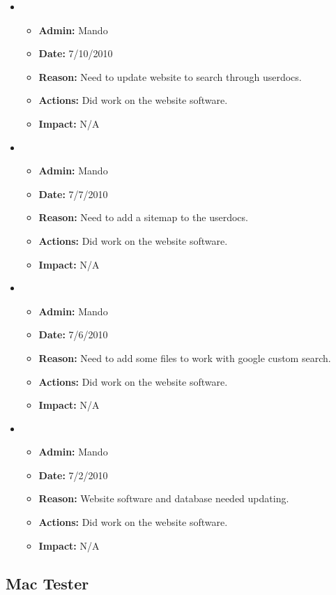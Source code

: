 \documentclass[12pt]{article}
\begin{document}
\begin{itemize}
\item 
\begin{itemize}
\item[] {\bf Admin:} Mando
\item[] {\bf Date:} 7/10/2010
\item[] {\bf Reason:} Need to update website to search through userdocs. 
\item[] {\bf Actions:} Did work on the website software. 
\item[] {\bf Impact:} N/A
\end{itemize}

\item 
\begin{itemize}
\item[] {\bf Admin:} Mando
\item[] {\bf Date:} 7/7/2010
\item[] {\bf Reason:} Need to add a sitemap to the userdocs.
\item[] {\bf Actions:} Did work on the website software. 
\item[] {\bf Impact:} N/A
\end{itemize}

\item 
\begin{itemize}
\item[] {\bf Admin:} Mando
\item[] {\bf Date:} 7/6/2010
\item[] {\bf Reason:} Need to add some files to work with google custom search.
\item[] {\bf Actions:} Did work on the website software. 
\item[] {\bf Impact:} N/A
\end{itemize}

\item 
\begin{itemize}
\item[] {\bf Admin:} Mando
\item[] {\bf Date:} 7/2/2010
\item[] {\bf Reason:} Website software and database needed updating.
\item[] {\bf Actions:} Did work on the website software. 
\item[] {\bf Impact:} N/A
\end{itemize}
\end{itemize}

\subsection*{Mac Tester}
\end{document}

